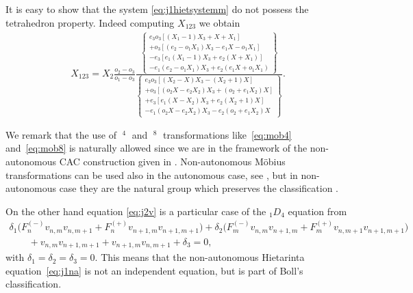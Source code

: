 \documentclass[pdftex]{sigma}
\numberwithin{equation}{section}
\DeclareMathOperator{\Mob}{M\ddot{o}b}
\begin{document}
It is easy to show that the system \eqref{eq:j1hietsystemm} do not possess the tetrahedron property. Indeed computing $X_{123}$ we obtain
\begin{gather*}
 X_{123}
 =
 X_{2}\frac{{ o_{2}}-{ o_{3}}}{{ o_{1}}-{ o_{3}}}
 {\frac {\left\{
 \begin{gathered}
 { e_{3}}o_{3}[ ( { X_{1}}-1 ) { X_{3}}+X+{ X_{1}} ]
 \\
 + o_{3}[( { e_{2}}-{ o_{1}} { X_{1}} ) { X_{3}}-{ e_{1}} X-{o_{1}} { X_{1}} ]
 \\
 - e_{3} [ e_{1} ( { X_{1}}-1 )X_{3}
 + e_{2}( X+{ X_{1}} ) ]
 \\
 -{ e_{1}} ( { e_{2}}-{ o_{1}} { X_{1}} ) { X_{3}}
 +{ e_{2}} ( { e_{1}} X+{ o_{1}} { X_{1}} )
 \end{gathered}
 \right\}}{
 \left\{
 \begin{gathered}
 e_{3}o_{3}
 [ (X_{2}-X ) X_{3}-( { X_{2}}+1 )X ]
 \\
 + o_{3}[( o_{2}X-e_{2}{ X_{2}}) { X_{3}}
 +( { o_{2}}+{ e_{1}} { X_{2}} )X ]
 \\
 +e_{3}
 [ { e_{1}} ( X-X_{2} ) { X_{3}}
 +e_{2}( { X_{2}}+1 )X ]
 \\
 -e_{1} (o_{2} X -e_{2} X_{2} ) { X_{3}}
 -e_{2} ( { o_{2}}+{ e_{1}} { X_{2}} ) X
 \end{gathered}\right\}
 }
 }
. %
\end{gather*}

\begin{Remark}
 We remark that the use of $\Mob^{4}$ and $\Mob^{8}$
 transformations like~\eqref{eq:mob4} and~\eqref{eq:mob8}
 is naturally allowed since we are in the framework of the
 non-autonomous CAC construction given in
 \cite{ABS2009,Boll2011,Boll2012a,Boll2012b}.
 Non-autonomous M\"obius transformations can be used also in
 the autonomous case, see \cite{ABS2003,Hietarinta2005}, but
 in non-autonomous case they are the natural group which
 preserves the classif\/ication \cite{GSL_general}.
\end{Remark}

On the other hand equation \eqref{eq:j2v} is a particular case of the $_{1}D_{4}$ equation from \cite{Boll2011,Boll2012a,Boll2012b,GSL_general}
\begin{gather}
\delta_{1}\big(F_{n}^{\left(-\right)}v_{n,m}v_{n,m+1}
 +F_{n}^{\left(+\right)}v_{n+1,m}v_{n+1,m+1}\big) +\delta_{2}\big(F_{m}^{(-)}v_{n,m}v_{n+1,m}+F_{m}^{(+)}v_{n,m+1}v_{n+1,m+1}\big)\nonumber\\
 \qquad{} +v_{n,m}v_{n+1,m+1}+v_{n+1,m}v_{n,m+1}+\delta_{3}=0, \label{eq:1D4}
\end{gather}
with $\delta_{1}=\delta_{2}=\delta_{3}=0$. This means that the non-autonomous Hietarinta equation~\eqref{eq:j1na} is not an independent equation, but is part of Boll's classif\/ication.
\end{document}
